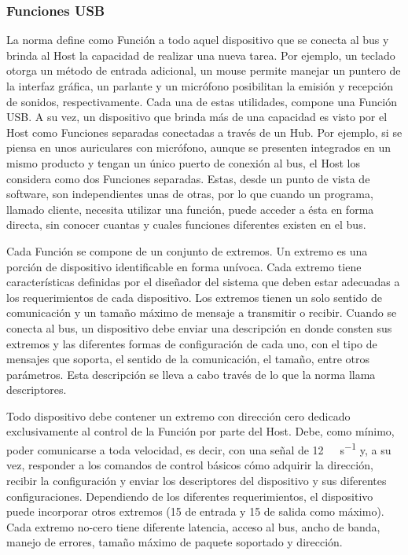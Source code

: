 \subsubsection{Funciones USB}
	La norma define como Función a todo aquel dispositivo que se conecta al bus y brinda al Host la capacidad de realizar una nueva tarea. Por ejemplo, un teclado otorga un método de entrada adicional, un mouse permite manejar un puntero de la interfaz gráfica, un parlante y un micrófono posibilitan la emisión y recepción de sonidos, respectivamente. Cada una de estas utilidades, compone una Función USB. A su vez, un dispositivo que brinda más de una capacidad es visto por el Host como Funciones separadas conectadas a través de un Hub. Por ejemplo, si se piensa en unos auriculares con micrófono, aunque se presenten integrados en un mismo producto y tengan un único puerto de conexión al bus, el Host los considera como dos Funciones separadas. Estas, desde un punto de vista de software, son independientes unas de otras, por lo que cuando un programa, llamado cliente, necesita utilizar una función, puede acceder a ésta en forma directa, sin conocer cuantas y cuales funciones diferentes existen en el bus.%
	
	Cada Función se compone de un conjunto de extremos. Un extremo es una porción de dispositivo identificable en forma unívoca\cite{USBspec}. Cada extremo tiene características definidas por el diseñador del sistema que deben estar adecuadas a los requerimientos de cada dispositivo. Los extremos tienen un solo sentido de comunicación y un tamaño máximo de mensaje a transmitir o recibir. Cuando se conecta al bus, un dispositivo debe enviar una descripción en donde consten sus extremos y las diferentes formas de configuración de cada uno, con el tipo de mensajes que soporta, el sentido de la comunicación, el tamaño, entre otros parámetros. Esta descripción se lleva a cabo través de lo que la norma llama descriptores.%
	
	Todo dispositivo debe contener un extremo con dirección cero dedicado exclusivamente al control de la Función por parte del Host. Debe, como mínimo, poder comunicarse a toda velocidad, es decir, con una señal de \SI{12}{\mega\bit\per\second} y, a su vez, responder a los comandos de control básicos cómo adquirir la dirección, recibir la configuración y enviar los descriptores del dispositivo y sus diferentes configuraciones. Dependiendo de los diferentes requerimientos, el dispositivo puede incorporar otros extremos (15 de entrada y 15 de salida como máximo). Cada extremo no-cero tiene diferente latencia, acceso al bus, ancho de banda, manejo de errores, tamaño máximo de paquete soportado y dirección.
	
